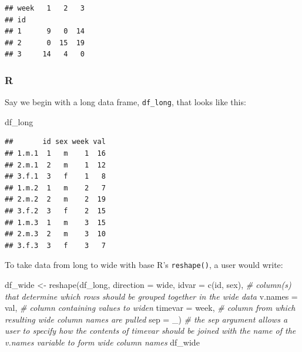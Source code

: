 \documentclass[
]{book}
\newenvironment{Shaded}{\begin{snugshade}}{\end{snugshade}}
\newcommand{\AttributeTok}[1]{\textcolor[rgb]{0.77,0.63,0.00}{#1}}
\newcommand{\CommentTok}[1]{\textcolor[rgb]{0.56,0.35,0.01}{\textit{#1}}}
\newcommand{\FunctionTok}[1]{\textcolor[rgb]{0.00,0.00,0.00}{#1}}
\newcommand{\NormalTok}[1]{#1}
\newcommand{\OtherTok}[1]{\textcolor[rgb]{0.56,0.35,0.01}{#1}}
\newcommand{\StringTok}[1]{\textcolor[rgb]{0.31,0.60,0.02}{#1}}
\begin{document}
\begin{verbatim}
## week   1   2   3
## id              
## 1      9   0  14
## 2      0  15  19
## 3     14   4   0
\end{verbatim}

\hypertarget{r-33}{%
\subsubsection*{R}\label{r-33}}

Say we begin with a long data frame, \texttt{df\_long}, that looks like this:

\begin{Shaded}
\begin{Highlighting}[]
\NormalTok{df\_long}
\end{Highlighting}
\end{Shaded}

\begin{verbatim}
##       id sex week val
## 1.m.1  1   m    1  16
## 2.m.1  2   m    1  12
## 3.f.1  3   f    1   8
## 1.m.2  1   m    2   7
## 2.m.2  2   m    2  19
## 3.f.2  3   f    2  15
## 1.m.3  1   m    3  15
## 2.m.3  2   m    3  10
## 3.f.3  3   f    3   7
\end{verbatim}

To take data from long to wide with base R's \texttt{reshape()}, a user would write:

\begin{Shaded}
\begin{Highlighting}[]
\NormalTok{df\_wide }\OtherTok{\textless{}{-}} \FunctionTok{reshape}\NormalTok{(df\_long,}
                   \AttributeTok{direction =} \StringTok{\textquotesingle{}wide\textquotesingle{}}\NormalTok{,}
                   \AttributeTok{idvar =} \FunctionTok{c}\NormalTok{(}\StringTok{\textquotesingle{}id\textquotesingle{}}\NormalTok{, }\StringTok{\textquotesingle{}sex\textquotesingle{}}\NormalTok{), }\CommentTok{\# column(s) that determine which rows should be grouped together in the wide data}
                   \AttributeTok{v.names =} \StringTok{\textquotesingle{}val\textquotesingle{}}\NormalTok{, }\CommentTok{\# column containing values to widen}
                   \AttributeTok{timevar =} \StringTok{\textquotesingle{}week\textquotesingle{}}\NormalTok{, }\CommentTok{\# column from which resulting wide column names are pulled}
                   \AttributeTok{sep =} \StringTok{\textquotesingle{}\_\textquotesingle{}}\NormalTok{) }\CommentTok{\# the \textasciigrave{}sep\textasciigrave{} argument allows a user to specify how the contents of \textasciigrave{}timevar\textasciigrave{} should be joined with the name of the \textasciigrave{}v.names\textasciigrave{} variable to form wide column names}
\NormalTok{df\_wide}
\end{Highlighting}
\end{Shaded}
\end{document}
